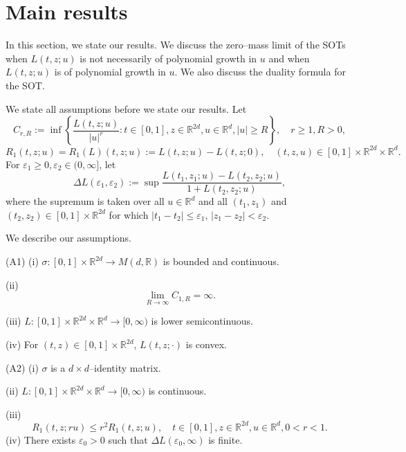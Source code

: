 \documentclass[12pt]{article}
\begin{document}

\section{Main results}\label{sec:2}


In this section, we state our results.
We discuss the zero--mass limit of the SOTs when $L(t,z;u)$ is not necessarily of polynomial growth in $u$ and when $L(t,z;u)$ is of polynomial growth in $u$.
We also discuss the duality formula for the SOT.

We state all assumptions before we state our results.
Let 
\begin{equation}
C_{r,R}:=\inf\left \{\frac{L(t,z;u)}{|u|^r}: t\in [0,1], z\in \mathbb{R}^{2d},u \in \mathbb{R}^d, |u|\ge R\right\},\quad r\ge 1, R>0,
\end{equation}
\begin{equation}
R_1(t,z;u)=R_1(L)(t,z;u):=L(t,z;u)-L(t,z;0),\quad (t,z,u)\in [0,1]\times \mathbb{R}^{2d}\times\mathbb{R}^d.
\end{equation}
For $\varepsilon_1\ge 0,\varepsilon_2\in (0,\infty]$, let
$$\Delta L(\varepsilon_1,\varepsilon_2):=\sup \frac{L(t_1,z_1;u)-L(t_2,z_2;u)}{1+L(t_2,z_2;u)},$$
where the supremum is taken over all $u\in \mathbb{R}^d $ and 
all $(t_1,z_1)$ and  $(t_2,z_2)\in [0,1]\times \mathbb{R}^{2d}$
for which $|t_1-t_2|\le\varepsilon_1$, $|z_1-z_2|< \varepsilon_2$.


We describe our assumptions.

\noindent
(A1)
(i) $\sigma:[0,1]\times\mathbb{R}^{2d}\rightarrow M(d,\mathbb{R})$ is bounded and continuous.

\noindent
(ii) 
\begin{equation}
\lim_{R\to\infty}C_{1,R}=\infty.
\end{equation}

\noindent
(iii)
$L:[0,1]\times\mathbb{R}^{2d}\times\mathbb{R}^d\rightarrow[0,\infty)$ is lower semicontinuous.

\noindent
(iv) For $(t,z)\in [0,1]\times\mathbb{R}^{2d}$, $L(t,z;\cdot)$ is convex.

\noindent
(A2) (i) $\sigma$ is a $d\times d$--identity matrix.

\noindent 
(ii) $L:[0,1]\times\mathbb{R}^{2d}\times\mathbb{R}^d
\rightarrow[0,\infty)$ is continuous.

\noindent
(iii) 
\begin{equation}\label{2.2}
R_1(t,z;ru)\le r^2R_1(t,z;u),\quad  t\in [0,1], z\in \mathbb{R}^{2d},u\in \mathbb{R}^d, 0<r<1.
\end{equation}
(iv) There exists $\varepsilon_0>0$ such that $\Delta L(\varepsilon_0,\infty)$ is finite.
\end{document}
